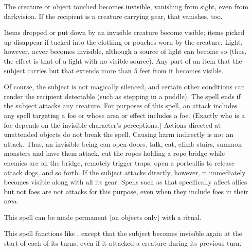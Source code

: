\spelldur{\durshort \dismissable}
\begin{spellsuccess}
    The creature or object touched becomes invisible, vanishing from sight, even from darkvision. If the recipient is a creature carrying gear, that vanishes, too.
    \par Items dropped or put down by an invisible creature become visible; items picked up disappear if tucked into the clothing or pouches worn by the creature. Light, however, never becomes invisible, although a source of light can become so (thus, the effect is that of a light with no visible source). Any part of an item that the subject carries but that extends more than 5 feet from it becomes visible.
    \par Of course, the subject is not magically silenced, and certain other conditions can render the recipient detectable (such as stepping in a puddle). The spell ends if the subject attacks any creature. For purposes of this spell, an attack includes any spell targeting a foe or whose area or effect includes a foe. (Exactly who is a foe depends on the invisible character's perceptions.) Actions directed at unattended objects do not break the spell. Causing harm indirectly is not an attack. Thus, an invisible being can open doors, talk, eat, climb stairs, summon monsters and have them attack, cut the ropes holding a rope bridge while enemies are on the bridge, remotely trigger traps, open a portcullis to release attack dogs, and so forth. If the subject attacks directly, however, it immediately becomes visible along with all its gear. Spells such as  that specifically affect allies but not foes are not attacks for this purpose, even when they include foes in their area.
\end{spellsuccess}
\begin{spellnotes}
    This spell can be made permanent (on objects only) with a  ritual.
\end{spellnotes}

\begin{spelleffect}
    This spell functions like , except that the subject becomes invisible again at the start of each of its turns, even if it attacked a creature during its previous turn.
\end{spelleffect}

